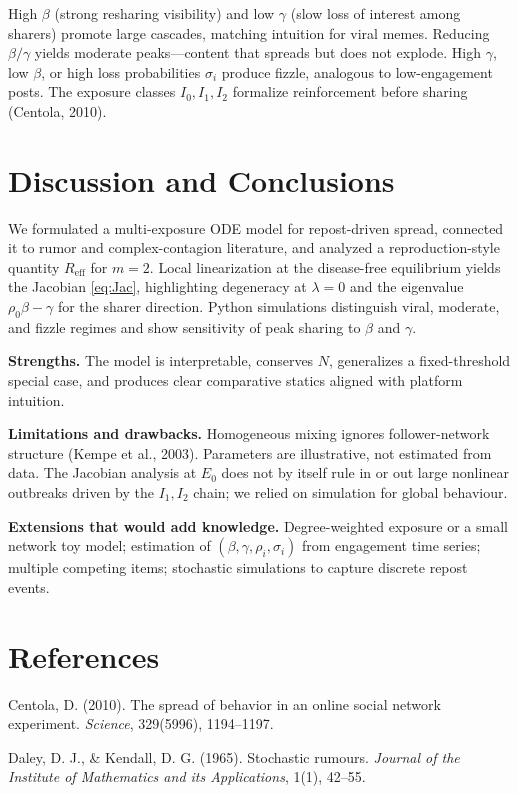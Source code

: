 \documentclass[11pt]{article}
\begin{document}
High $\beta$ (strong resharing visibility) and low $\gamma$ (slow loss of interest among sharers) promote large cascades, matching intuition for viral memes. Reducing $\beta/\gamma$ yields moderate peaks---content that spreads but does not explode. High $\gamma$, low $\beta$, or high loss probabilities $\sigma_i$ produce fizzle, analogous to low-engagement posts. The exposure classes $I_0,I_1,I_2$ formalize reinforcement before sharing (Centola, 2010).

\section{Discussion and Conclusions}

We formulated a multi-exposure ODE model for repost-driven spread, connected it to rumor and complex-contagion literature, and analyzed a reproduction-style quantity $R_{\mathrm{eff}}$ for $m=2$. Local linearization at the disease-free equilibrium yields the Jacobian \eqref{eq:Jac}, highlighting degeneracy at $\lambda=0$ and the eigenvalue $\rho_0\beta-\gamma$ for the sharer direction. Python simulations distinguish viral, moderate, and fizzle regimes and show sensitivity of peak sharing to $\beta$ and $\gamma$.

\textbf{Strengths.} The model is interpretable, conserves $N$, generalizes a fixed-threshold special case, and produces clear comparative statics aligned with platform intuition.

\textbf{Limitations and drawbacks.} Homogeneous mixing ignores follower-network structure (Kempe et al., 2003). Parameters are illustrative, not estimated from data. The Jacobian analysis at $E_0$ does not by itself rule in or out large nonlinear outbreaks driven by the $I_1,I_2$ chain; we relied on simulation for global behaviour.

\textbf{Extensions that would add knowledge.} Degree-weighted exposure or a small network toy model; estimation of $(\beta,\gamma,\rho_i,\sigma_i)$ from engagement time series; multiple competing items; stochastic simulations to capture discrete repost events.

\section{References}

Centola, D. (2010). The spread of behavior in an online social network experiment. \textit{Science}, 329(5996), 1194--1197.

Daley, D. J., \& Kendall, D. G. (1965). Stochastic rumours. \textit{Journal of the Institute of Mathematics and its Applications}, 1(1), 42--55.
\end{document}
